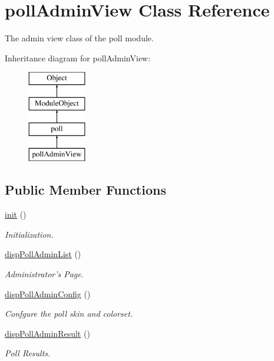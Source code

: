 \hypertarget{classpollAdminView}{\section{poll\-Admin\-View Class Reference}
\label{classpollAdminView}
}


The admin view class of the poll module.  


Inheritance diagram for poll\-Admin\-View\-:\begin{figure}[H]
\begin{center}
\leavevmode
\includegraphics[height=4.000000cm]{classpollAdminView}
\end{center}
\end{figure}
\subsection*{Public Member Functions}
\begin{DoxyCompactItemize}
\item 
\hyperlink{classpollAdminView_af5d64cefd4797770bd159956c19bb48b}{init} ()
\begin{DoxyCompactList}\small\item\em Initialization. \end{DoxyCompactList}\item 
\hyperlink{classpollAdminView_a6c6fb22f667d20327d6770a3227c2875}{disp\-Poll\-Admin\-List} ()
\begin{DoxyCompactList}\small\item\em Administrator's Page. \end{DoxyCompactList}\item 
\hyperlink{classpollAdminView_a187abafd38bcaa2b0f72b4f08e667be8}{disp\-Poll\-Admin\-Config} ()
\begin{DoxyCompactList}\small\item\em Confgure the poll skin and colorset. \end{DoxyCompactList}\item 
\hyperlink{classpollAdminView_ae05b1788a9f40401af695a961137663a}{disp\-Poll\-Admin\-Result} ()
\begin{DoxyCompactList}\small\item\em Poll Results. \end{DoxyCompactList}\end{DoxyCompactItemize}

